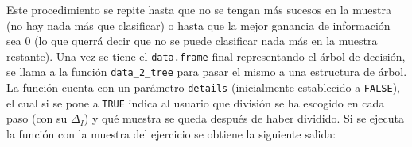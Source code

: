 \documentclass[12pt]{report}\usepackage[]{graphicx}\usepackage[dvipsnames]{xcolor}
\begin{document}
	 			Este procedimiento se repite hasta que no se tengan más sucesos en la muestra (no hay nada más que clasificar) o hasta que la mejor ganancia de información sea 0 (lo que querrá decir que no se puede clasificar nada más en la muestra restante). Una vez se tiene el \texttt{data.frame} final representando el árbol de decisión, se llama a la función \texttt{data\_2\_tree} para pasar el mismo a una estructura de árbol.\\ 
	 			
	 			La función cuenta con un parámetro \texttt{details} (inicialmente establecido a \texttt{FALSE}), el cual si se pone a \texttt{TRUE} indica al usuario que división se ha escogido en cada paso (con su $\Delta_I$) y qué muestra se queda después de haber dividido. Si se ejecuta la función con la muestra del ejercicio se obtiene la siguiente salida:
	 			
\end{document}
